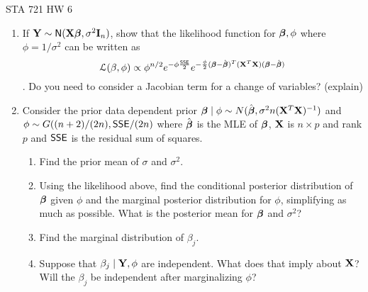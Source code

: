 \documentclass{article}
\begin{document}
\begin{center}
  STA 721 HW 6
\end{center}


\begin{enumerate}
\item If $\mathbf{Y} \sim \textsf{N}(\mathbf{X}\boldsymbol{\beta}, \sigma^2 \mathbf{I}_n)$, show that the likelihood
  function for $\boldsymbol{\beta}, \phi$ where $\phi = 1/\sigma^2$ can be written as 
 $${\cal{L}}(\beta, \phi) \propto \phi^{n/2} e^{- \phi \frac{\textsf{SSE}}{2}}
e^{-\frac{\phi}{2} (\boldsymbol{\beta} - \hat{\boldsymbol{\beta}})^T(\mathbf{X}^T\mathbf{X}) (\boldsymbol{\beta} - \hat{\boldsymbol{\beta}})}$$.   Do you
need to consider a Jacobian term for a change of variables?  (explain)

\item Consider the prior data dependent prior $\boldsymbol{\beta} \mid \phi \sim N(\hat{\boldsymbol{\beta}}, \sigma^2 n
  (\mathbf{X}^T\mathbf{X})^{-1})$ and   $\phi \sim G((n + 2)/(2n), \textsf{SSE}/(2n)$
where $\hat{\boldsymbol{\beta}}$ is the MLE of $\boldsymbol{\beta}$, $\mathbf{X}$ is $n \times p$ and rank $p$
and $\textsf{SSE}$ is the residual sum of squares.
  \begin{enumerate}
  \item  Find the prior mean of $\sigma$ and $\sigma^2$.
  \item  Using the likelihood above, find the conditional posterior distribution of $\boldsymbol{\beta}$ given
    $\phi$ and the marginal posterior distribution for $\phi$,
    simplifying as much as possible.  What
    is the posterior mean for $\boldsymbol{\beta}$ and $\sigma^2$?   
  \item Find the marginal distribution of $\beta_j$.
  \item Suppose that $\beta_j \mid \mathbf{Y}, \phi$ are independent.  What
    does that imply about $\mathbf{X}$?  Will the $\beta_j$ be independent
    after marginalizing $\phi$?
  \end{enumerate}
\end{enumerate}
\end{document}
